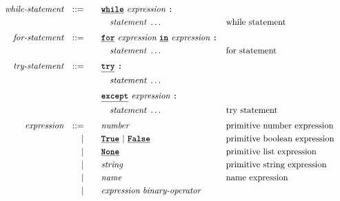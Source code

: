 \begin{alignat*}{9}
&& \textit{while-statement} && ::= &\quad &&  \textbf{\texttt{\underline{while}}}\ \textit{expression} \ 
                                           \textbf{\texttt{:}}  \\
&&                       &&     &\quad && \quad \textit{statement} \ \ldots \quad
                                                           &&  \textrm{while statement} \\[1mm]
&& \textit{for-statement} && ::= &\quad &&  \textbf{\texttt{\underline{for}}}\ \textit{expression} \ 
                                           \textbf{\texttt{\underline{in}}}\ \textit{expression} \ \textbf{\texttt{:}}  \\
&&                       &&     &\quad && \quad \textit{statement} \ \ldots \quad
                                                           &&  \textrm{for statement} \\[1mm]
&& \textit{try-statement} && ::= &\quad &&  \textbf{\texttt{\underline{try}}}\                      
\textbf{\texttt{:}}  \\
&&                       &&     &\quad && \quad \textit{statement} \ \ldots \quad
                                                           &&  \\[1mm]
&&                       &&     &\quad &&  \textbf{\texttt{\underline{except}}}\ \textit{expression} \ 
                                            \textbf{\texttt{:}}  \\
&&                       &&     &\quad && \quad \textit{statement} \ \ldots \quad
                                                           &&  \textrm{try statement} \\[1mm]
&& \textit{expression}   && ::= &\quad &&  \textit{number}   && \textrm{primitive number expression}\\
&&                       && |   &\quad && \textbf{\texttt{\underline{True}}}\ |\ \textbf{\texttt{\underline{False}}}
                                                           && \textrm{primitive boolean expression}\\
&&                       && |   &\quad &&  \textbf{\texttt{\underline{None}}} \   && \textrm{primitive list expression}\\
&&                       && |   &\quad &&  \textit{string}   && \textrm{primitive string expression}\\
&&                       && |   &\quad &&  \textit{name}   && \textrm{name expression}\\
&&                       && |   &\quad &&  \textit{expression} \  \textit{binary-operator} \ 

\end{alignat*}
